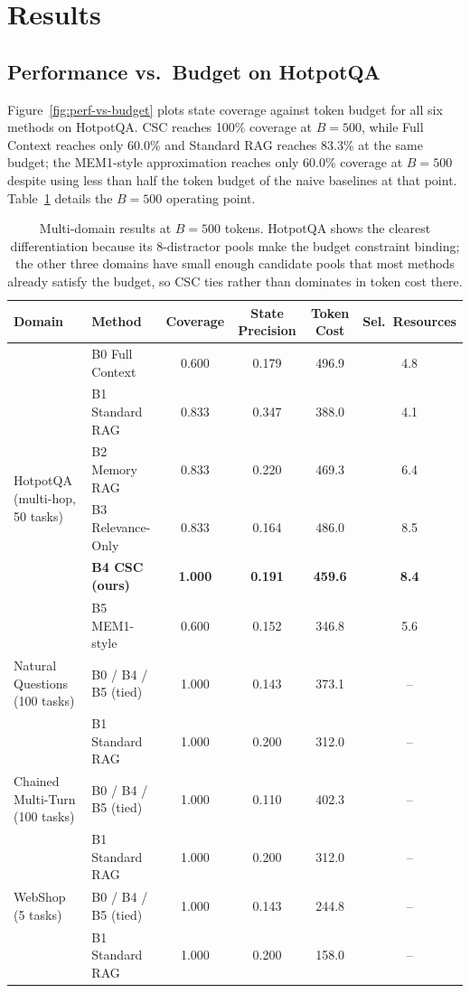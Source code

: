 \documentclass{article}
\begin{document}
\section{Results}
\label{sec:results}

\subsection{Performance vs.\ Budget on HotpotQA}
Figure~\ref{fig:perf-vs-budget} plots state coverage against token budget for all six methods on HotpotQA. CSC reaches 100\% coverage at $B=500$, while Full Context reaches only 60.0\% and Standard RAG reaches 83.3\% at the same budget; the MEM1-style approximation reaches only 60.0\% coverage at $B=500$ despite using less than half the token budget of the naive baselines at that point. Table~\ref{tab:hotpotqa-b500} details the $B=500$ operating point.

\begin{table}[t]
\caption{Multi-domain results at $B=500$ tokens. HotpotQA shows the clearest differentiation because its 8-distractor pools make the budget constraint binding; the other three domains have small enough candidate pools that most methods already satisfy the budget, so CSC ties rather than dominates in token cost there.}
\label{tab:hotpotqa-b500}
\centering
\small
\begin{tabular}{llcccc}
\toprule
Domain & Method & Coverage & State Precision & Token Cost & Sel.\ Resources \\
\midrule
\multirow{6}{*}{HotpotQA (multi-hop, 50 tasks)}
 & B0 Full Context     & 0.600 & 0.179 & 496.9 & 4.8 \\
 & B1 Standard RAG     & 0.833 & 0.347 & 388.0 & 4.1 \\
 & B2 Memory RAG       & 0.833 & 0.220 & 469.3 & 6.4 \\
 & B3 Relevance-Only   & 0.833 & 0.164 & 486.0 & 8.5 \\
 & \textbf{B4 CSC (ours)} & \textbf{1.000} & \textbf{0.191} & \textbf{459.6} & \textbf{8.4} \\
 & B5 MEM1-style       & 0.600 & 0.152 & 346.8 & 5.6 \\
\midrule
Natural Questions (100 tasks)  & B0 / B4 / B5 (tied) & 1.000 & 0.143 & 373.1 & -- \\
                                & B1 Standard RAG     & 1.000 & 0.200 & 312.0 & -- \\
\midrule
Chained Multi-Turn (100 tasks) & B0 / B4 / B5 (tied) & 1.000 & 0.110 & 402.3 & -- \\
                                & B1 Standard RAG     & 1.000 & 0.200 & 312.0 & -- \\
\midrule
WebShop (5 tasks)              & B0 / B4 / B5 (tied) & 1.000 & 0.143 & 244.8 & -- \\
                                & B1 Standard RAG     & 1.000 & 0.200 & 158.0 & -- \\
\bottomrule
\end{tabular}
\end{table}
\end{document}
